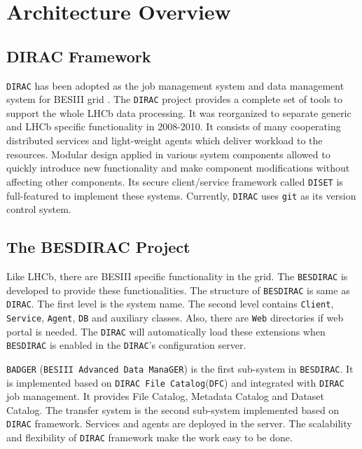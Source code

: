 \section{Architecture Overview}

\subsection{DIRAC Framework}

{\tt DIRAC} \cite{bib:dirac3,bib:diracgit} 
has been adopted as the job management system and data management
system for BESIII grid \cite{bib:besdfc}. 
The {\tt DIRAC} project provides a 
complete set of tools to support the whole LHCb data processing.
It was reorganized to separate generic and LHCb specific functionality
in 2008-2010.
%
It consists of many cooperating distributed services and light-weight
agents which deliver workload to the resources.
Modular design applied in various system components allowed to quickly
introduce new functionality and make component modifications without
affecting other components.
Its secure client/service framework called {\tt DISET} \cite{bib:diset} 
is full-featured to implement these systems.
Currently, {\tt DIRAC} uses {\tt git} as its version control system.

\subsection{The BESDIRAC Project}

Like LHCb, there are BESIII specific functionality in the grid.
The {\tt BESDIRAC} \cite{bib:besdirac} 
is developed to provide these functionalities.
The structure of {\tt BESDIRAC} is same as {\tt DIRAC}.
The first level is the system name. The second level contains
{\tt Client}, {\tt Service}, {\tt Agent}, {\tt DB} and auxiliary classes.
Also, there are {\tt Web} directories if web portal is needed.
The {\tt DIRAC} will automatically load these extensions when 
{\tt BESDIRAC} is enabled in the {\tt DIRAC}'s configuration server.

{\tt BADGER} (\verb"BESIII Advanced Data ManaGER") is the first sub-system
in {\tt BESDIRAC}. It is implemented based on {\tt DIRAC File
Catalog}(\verb"DFC")
and integrated with {\tt DIRAC} job management.
It provides File Catalog, Metadata Catalog and Dataset Catalog.
%
The transfer system is the second sub-system implemented based on
{\tt DIRAC} framework. Services and agents are deployed in the server.
The scalability and flexibility of {\tt DIRAC} framework make the work
easy to be done. 

